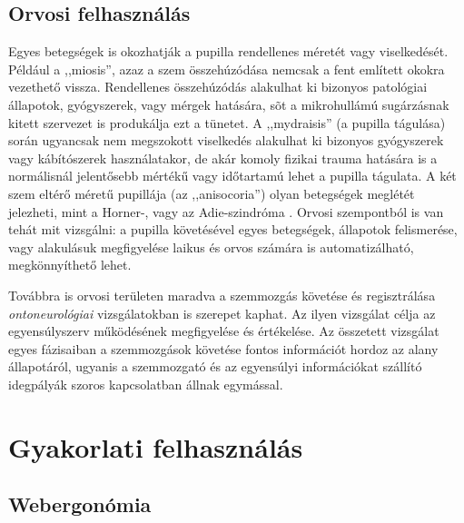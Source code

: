 \subsection{Orvosi felhasználás}\label{sect:orvosi_felh}

Egyes betegségek is okozhatják a pupilla rendellenes méretét vagy viselkedését. Például a ,,miosis'', azaz a szem összehúzódása nemcsak a fent említett okokra vezethető vissza. Rendellenes összehúzódás alakulhat ki bizonyos patológiai állapotok, gyógyszerek, vagy mérgek hatására, sõt a mikrohullámú sugárzásnak kitett szervezet is produkálja ezt a tünetet. A ,,mydraisis'' (a pupilla tágulása) során ugyancsak nem megszokott viselkedés alakulhat ki bizonyos gyógyszerek vagy kábítószerek használatakor, de akár komoly fizikai trauma hatására is a normálisnál jelentősebb mértékű vagy időtartamú lehet a pupilla tágulata. A két szem eltérő méretű pupillája (az ,,anisocoria'') olyan betegségek meglétét jelezheti, mint a Horner-, vagy az Adie-szindróma \cite{altpszicho}. Orvosi szempontból is van tehát mit vizsgálni: a pupilla követésével egyes betegségek, állapotok felismerése, vagy alakulásuk megfigyelése laikus és orvos számára is automatizálható, megkönnyíthető lehet.

\bigskip

Továbbra is orvosi területen maradva a szemmozgás követése és regisztrálása \emph{ontoneurológiai} vizsgálatokban is szerepet kaphat. Az ilyen vizsgálat célja az egyensúlyszerv működésének megfigyelése és értékelése. Az összetett vizsgálat egyes fázisaiban a szemmozgások követése fontos információt hordoz az alany állapotáról, ugyanis a szemmozgató és az egyensúlyi információkat szállító idegpályák szoros kapcsolatban állnak egymással.

\section{Gyakorlati felhasználás}\label{sect:gyakorlati}

\subsection{Webergonómia}\label{sect:webergonomia}

